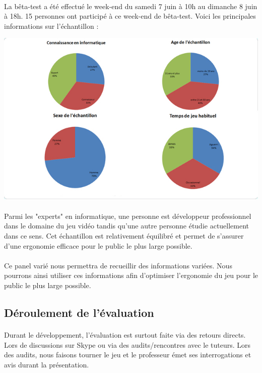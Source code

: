 \documentclass[11pt]{article} %
\begin{document}
\paragraph{}
La bêta-test a été effectué le week-end du samedi 7 juin à 10h au dimanche 8 juin à 18h. 15 personnes ont participé à ce week-end de bêta-test. Voici les principales informations sur l'échantillon :

\begin{center}
\includegraphics[width=15cm]{echantillon.jpg}
\end{center}

\paragraph{}
Parmi les "experts" en informatique, une personne est développeur professionnel dans le domaine du jeu vidéo tandis qu'une autre personne étudie actuellement dans ce sens. Cet échantillon est relativement équilibré et permet de s'assurer d'une ergonomie efficace pour le public le plus large possible.

\paragraph{}
Ce panel varié nous permettra de recueillir des informations variées. Nous pourrons ainsi utiliser ces informations afin d'optimiser l'ergonomie du jeu pour le public le plus large possible.

\subsection{Déroulement de l'évaluation}
\paragraph{}
Durant le développement, l’évaluation est surtout faite via des retours directs. Lors de discussions sur Skype ou via des audits/rencontres avec le tuteurs. Lors des audits, nous faisons tourner le jeu et le professeur émet ses interrogations et avis durant la présentation. 
\end{document}
